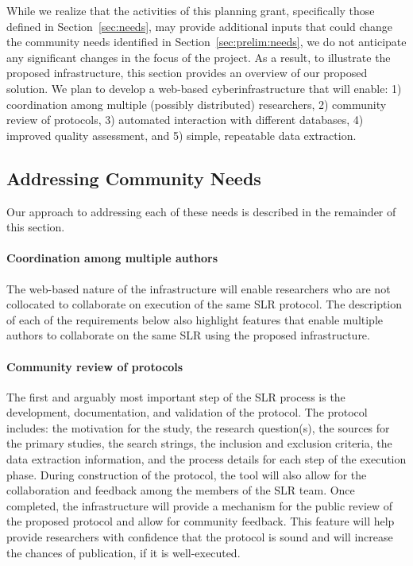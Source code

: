 
While we realize that the activities of this planning grant, specifically those defined in Section~\ref{sec:needs}, may provide additional inputs that could change the community needs identified in Section~\ref{sec:prelim:needs}, we do not anticipate any significant changes in the focus of the project. As a result, to illustrate the proposed infrastructure, this section provides an overview of our proposed solution. We plan to develop a web-based cyberinfrastructure that will enable: 1) coordination among multiple (possibly distributed) researchers, 2) community review of protocols, 3) automated interaction with different databases, 4) improved quality assessment, and 5) simple, repeatable data extraction. 

\subsection{Addressing Community Needs}
Our approach to addressing each of these needs is described in the remainder of this section.

\paragraph{Coordination among multiple authors} The web-based nature of the infrastructure will enable researchers who are not collocated to collaborate on execution of the same SLR protocol. The description of each of the requirements below also highlight features that enable multiple authors to collaborate on the same SLR using the proposed infrastructure. 

\paragraph{Community review of protocols}
The first and arguably most important step of the SLR process is the development, documentation, and validation of the protocol. The protocol includes: the motivation for the study, the research question(s), the sources for the primary studies, the search strings, the inclusion and exclusion criteria, the data extraction information, and the process details for each step of the execution phase. During construction of the protocol, the tool will also allow for the collaboration and feedback among the members of the SLR team. Once completed, the infrastructure will provide a mechanism for the public review of the proposed protocol and allow for community feedback. This feature will help provide researchers with confidence that the protocol is sound and will increase the chances of publication, if it is well-executed.

